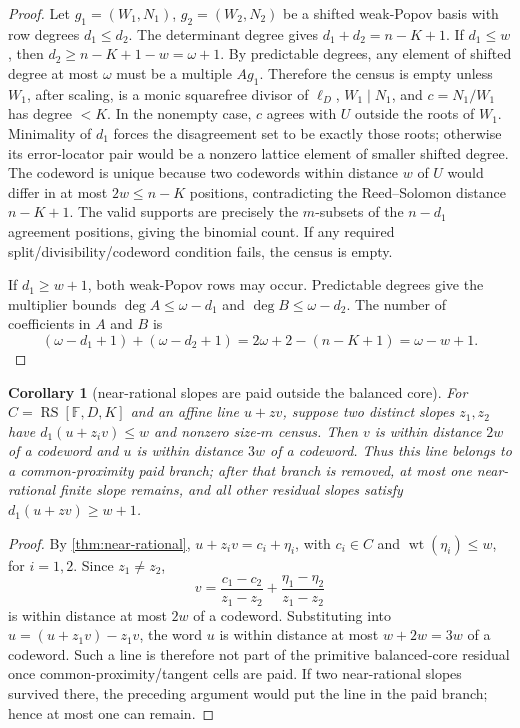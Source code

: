 \documentclass[a4paper,11pt]{amsart}
\newtheorem{corollary}[theorem]{Corollary}
\theoremstyle{remark}
\newcommand{\F}{\mathbb F}
\newcommand{\RS}{\operatorname{RS}}
\begin{document}
\begin{proof}
Let \(g_1=(W_1,N_1)\), \(g_2=(W_2,N_2)\) be a shifted weak-Popov basis with row degrees \(d_1\le d_2\).  The determinant degree gives \(d_1+d_2=n-K+1\).  If \(d_1\le w\), then \(d_2\ge n-K+1-w=\omega+1\).  By predictable degrees, any element of shifted degree at most \(\omega\) must be a multiple \(Ag_1\).  Therefore the census is empty unless \(W_1\), after scaling, is a monic squarefree divisor of \(\ell_D\), \(W_1\mid N_1\), and \(c=N_1/W_1\) has degree \(<K\).  In the nonempty case, \(c\) agrees with \(U\) outside the roots of \(W_1\).  Minimality of \(d_1\) forces the disagreement set to be exactly those roots; otherwise its error-locator pair would be a nonzero lattice element of smaller shifted degree.  The codeword is unique because two codewords within distance \(w\) of \(U\) would differ in at most \(2w\le n-K\) positions, contradicting the Reed--Solomon distance \(n-K+1\).  The valid supports are precisely the \(m\)-subsets of the \(n-d_1\) agreement positions, giving the binomial count.  If any required split/divisibility/codeword condition fails, the census is empty.

If \(d_1\ge w+1\), both weak-Popov rows may occur.  Predictable degrees give the multiplier bounds \(\deg A\le\omega-d_1\) and \(\deg B\le\omega-d_2\).  The number of coefficients in \(A\) and \(B\) is
\[
        (\omega-d_1+1)+(\omega-d_2+1)
        =2\omega+2-(n-K+1)=\omega-w+1.
\]
\end{proof}

\begin{corollary}[near-rational slopes are paid outside the balanced core]\label{cor:near-rational-line}
For \(C=\RS[\F,D,K]\) and an affine line \(u+zv\), suppose two distinct slopes \(z_1,z_2\) have \(d_1(u+z_iv)\le w\) and nonzero size-\(m\) census.  Then \(v\) is within distance \(2w\) of a codeword and \(u\) is within distance \(3w\) of a codeword.  Thus this line belongs to a common-proximity paid branch; after that branch is removed, at most one near-rational finite slope remains, and all other residual slopes satisfy \(d_1(u+zv)\ge w+1\).
\end{corollary}

\begin{proof}
By \cref{thm:near-rational}, \(u+z_i v=c_i+\eta_i\), with \(c_i\in C\) and \(\operatorname{wt}(\eta_i)\le w\), for \(i=1,2\).  Since \(z_1\ne z_2\),
\[
        v=\frac{c_1-c_2}{z_1-z_2}+\frac{\eta_1-\eta_2}{z_1-z_2}
\]
is within distance at most \(2w\) of a codeword.  Substituting into \(u=(u+z_1v)-z_1v\), the word \(u\) is within distance at most \(w+2w=3w\) of a codeword.  Such a line is therefore not part of the primitive balanced-core residual once common-proximity/tangent cells are paid.  If two near-rational slopes survived there, the preceding argument would put the line in the paid branch; hence at most one can remain.
\end{proof}
\end{document}
